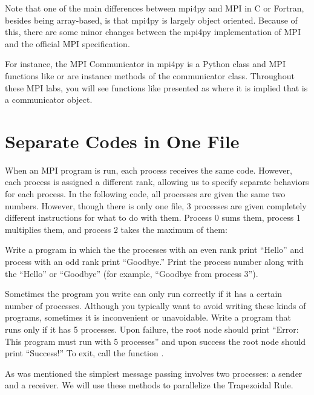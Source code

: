 Note that one of the main differences between mpi4py and MPI in C or Fortran, 
besides being array-based, is that mpi4py is largely object oriented. 
Because of this, there are some minor changes between the mpi4py implementation of 
MPI and the official MPI specification.

For instance, the MPI Communicator in mpi4py is a Python class and MPI functions 
like  or  are instance methods of the communicator class. 
Throughout these MPI labs, you will see functions like  presented as 
 where it is implied that  is a communicator object.

\section*{Separate Codes in One File}
When an MPI program is run, each process receives the same code. 
However, each process is assigned a different rank, allowing us to specify separate 
behaviors for each process. In the following code, all processes are given the same two numbers. 
However, though there is only one file, 3 processes are given completely different instructions 
for what to do with them. Process 0 sums them, process 1 multiplies them, 
and process 2 takes the maximum of them:


\begin{problem}
Write a program in which the the processes with an even rank print ``Hello'' and 
process with an odd rank print ``Goodbye.'' 
Print the process number along with the ``Hello'' or ``Goodbye'' 
(for example, ``Goodbye from process 3'').
\end{problem}

\begin{problem}
Sometimes the program you write can only run correctly if it has a certain number of processes. 
Although you typically want to avoid writing these kinds of programs, sometimes it is 
inconvenient or unavoidable. Write a program that runs only if it has 5 processes. 
Upon failure, the root node should print ``Error: This program must run with 5 processes'' 
and upon success the root node should print ``Success!'' To exit, call the function 
.
\end{problem}

As was mentioned the simplest message passing involves two processes: a sender and a receiver. We will use these methods to parallelize the Trapezoidal Rule.

